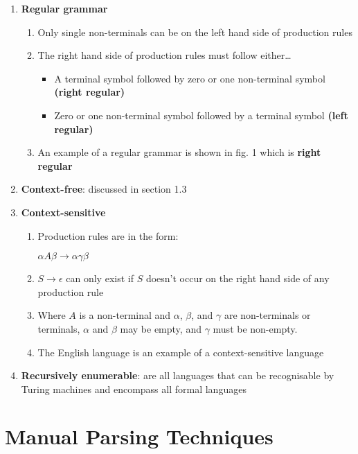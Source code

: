 \documentclass[12pt, letterpaper]{article}
\theoremstyle{definition}
\begin{document}
\begin{enumerate}
    \item \textbf{Regular grammar}
    \begin{enumerate}
        \item Only single non-terminals can be on the left hand side of production rules
        \item The right hand side of production rules must follow either\dots
        \begin{itemize}
            \item A terminal symbol followed by zero or one non-terminal symbol \textbf{(right regular)}
            \item Zero or one non-terminal symbol followed by a terminal symbol \textbf{(left regular)}
        \end{itemize}
        \item An example of a regular grammar is shown in fig. 1 which is \textbf{right regular}
    \end{enumerate}
    \item \textbf{Context-free}: discussed in section 1.3
    \item \textbf{Context-sensitive}
    \begin{enumerate}
        \item Production rules are in the form:
        \begin{center}
            $\alpha A \beta \rightarrow \alpha \gamma \beta$
        \end{center}
        \item $S \rightarrow \epsilon$ can only exist if $S$ doesn't occur on the right hand side of any production rule
        \item Where $A$ is a non-terminal and $\alpha$, $\beta$, and $\gamma$ are non-terminals or terminals, $\alpha$ and $\beta$ may be empty, and $\gamma$ must be non-empty.
        \item The English language is an example of a context-sensitive language
    \end{enumerate}
    \item \textbf{Recursively enumerable}: are all languages that can be recognisable by Turing machines and encompass all formal languages
\end{enumerate}

\pagebreak

\section{Manual Parsing Techniques}
\end{document}
